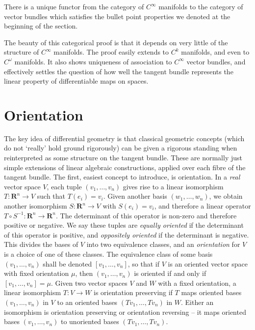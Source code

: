 \begin{theorem}
    There is a unique functor from the category of $C^\infty$ manifolds to the category of vector bundles which satisfies the bullet point properties we denoted at the beginning of the section.
\end{theorem}

The beauty of this categorical proof is that it depends on very little of the structure of $C^\infty$ manifolds. The proof easily extends to $C^k$ manifolds, and even to $C^\omega$ manifolds. It also shows uniqueness of association to $C^\infty$ vector bundles, and effectively settles the question of how well the tangent bundle represents the linear property of differentiable maps on spaces.

\section{Orientation}

The key idea of differential geometry is that classical geometric concepts (which do not `really' hold ground rigorously) can be given a rigorous standing when reinterpreted as some structure on the tangent bundle. These are normally just simple extensions of linear algebraic constructions, applied over each fibre of the tangent bundle. The first, easiest concept to introduce, is orientation. In a {\it real} vector space $V$, each tuple $(v_1, \dots, v_n)$ gives rise to a linear isomorphism $T: \mathbf{R}^n \to V$ such that $T(e_i) = v_i$. Given another basis $(w_1, \dots, w_n)$, we obtain another isomorphism $S: \mathbf{R}^n \to V$ with $S(e_i) = v_i$, and therefore a linear operator $T \circ S^{-1}: \mathbf{R}^n \to \mathbf{R}^n$. The determinant of this operator is non-zero and therefore positive or negative. We say these tuples are {\it equally oriented} if the determinant of this operator is positive, and {\it oppositely oriented} if the determinant is negative. This divides the bases of $V$ into two equivalence classes, and an \emph{orientation} for $V$ is a choice of one of these classes. The equivalence class of some basis $(v_1, \dots, v_n)$ shall be denoted $[v_1, \dots, v_n]$, so that if $V$ is an oriented vector space with fixed orientation $\mu$, then $(v_1, \dots, v_n)$ is oriented if and only if $[v_1, \dots, v_n] = \mu$. Given two vector spaces $V$ and $W$ with a fixed orientation, a linear isomorphism $T: V \to W$ is orientation preserving if $T$ maps oriented bases $(v_1, \dots, v_n)$ in $V$ to an oriented bases $(Tv_1, \dots, Tv_n)$ in $W$. Either an isomorphism is orientation preserving or orientation reversing -- it maps oriented bases $(v_1, \dots, v_n)$ to unoriented bases $(Tv_1, \dots, Tv_n)$.

